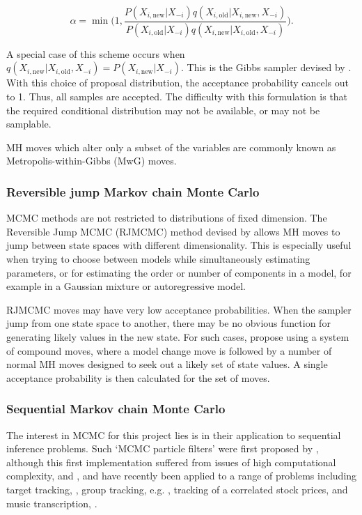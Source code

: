 \begin{equation}
\alpha %
= \min \bigg ( 1,  \frac{ P(X_{i,\text{new}}|X_{-i}) q(X_{i,\text{old}}|X_{i,\text{new}}, X_{-i}) }{ P(X_{i,\text{old}}|X_{-i}) q(X_{i,\text{new}}|X_{i,\text{old}}, X_{-i}) }  \bigg )
.
\end{equation}

A special case of this scheme occurs when $q(X_{i,\text{new}}|X_{i,\text{old}}, X_{-i}) = P(X_{i,\text{new}}|X_{-i})$. This is the Gibbs sampler devised by \cite{Geman1984}. With this choice of proposal distribution, the acceptance probability cancels out to 1. Thus, all samples are accepted. The difficulty with this formulation is that the required conditional distribution may not be available, or may not be samplable.

MH moves which alter only a subset of the variables are commonly known as Metropolis-within-Gibbs (MwG) moves.

\subsubsection{Reversible jump Markov chain Monte Carlo}
MCMC methods are not restricted to distributions of fixed dimension. The Reversible Jump MCMC (RJMCMC) method devised by \cite{Green1995} allows MH moves to jump between state spaces with different dimensionality. This is especially useful when trying to choose between models while simultaneously estimating parameters, or for estimating the order or number of components in a model, for example in a Gaussian mixture or autoregressive model.

RJMCMC moves may have very low acceptance probabilities. When the sampler jump from one state space to another, there may be no obvious function for generating likely values in the new state. For such cases, \cite{Al-Awadhi2004} propose using a system of compound moves, where a model change move is followed by a number of normal MH moves designed to seek out a likely set of state values. A single acceptance probability is then calculated for the set of moves. 

\subsubsection{Sequential Markov chain Monte Carlo}
The interest in MCMC for this project lies is in their application to sequential inference problems. Such `MCMC particle filters' were first proposed by \cite{Khan2005}, although this first implementation suffered from issues of high computational complexity, and \cite{Golightly2006}, and have recently been applied to a range of problems including target tracking, \cite{Septier2009}, group tracking, e.g. \cite{Carmi2009}, tracking of a correlated stock prices, \cite{Pang2011} and music transcription, \cite{Bunch2010}.

